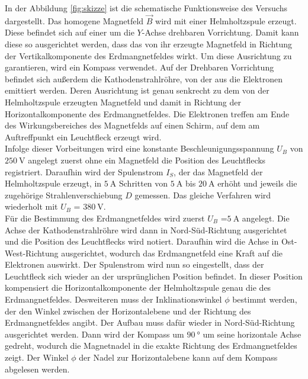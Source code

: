 In der Abbildung \ref{fig:skizze} ist die schematische Funktionsweise des Versuchs dargestellt. Das homogene Magnetfeld $\vec{B}$
wird mit einer Helmholtzspule erzeugt. Diese befindet sich auf einer um die $Y$-Achse drehbaren Vorrichtung. Damit kann diese 
so ausgerichtet werden, dass das von ihr erzeugte Magnetfeld in Richtung der Vertikalkomponente des Erdmangnetfeldes wirkt. 
Um diese Ausrichtung zu garantieren, wird ein Kompass verwendet. Auf der Drehbaren Vorrichtung befindet sich außerdem die 
Kathodenstrahlröhre, von der aus die Elektronen emittiert werden. Deren Ausrichtung ist genau senkrecht zu dem von der 
Helmholtzspule erzeugten Magnetfeld und damit in Richtung der Horizontalkomponente des Erdmangnetfeldes. Die Elektronen 
treffen am Ende des Wirkungsbereiches des Magnetfelds auf einen Schirm, auf dem am Auftreffpunkt ein Leuchtfleck erzeugt wird.\\
Infolge dieser Vorbeitungen wird eine konstante Beschleunigungsspannung $U_B$ von $\SI{250}{\volt} $ angelegt zuerst ohne ein 
Magnetfeld die Position des Leuchtflecks registriert. Daraufhin wird der Spulenstrom $I_S$, der das Magnetfeld der 
Helmholtzspule erzeugt, in $\SI{5}{\ampere} $ Schritten von $\SI{5}{\ampere} $ bis $\SI{20}{\ampere} $ erhöht und jeweils 
die zugehörige Strahlenverschiebung $D$ gemessen. Das gleiche Verfahren wird wiederholt mit $U_B$ = $\SI{380}{\volt} $. \\
Für die Bestimmung des Erdmangnetfeldes wird zuerst $U_B$ =$\SI{5}{\ampere} $ angelegt. Die Achse der Kathodenstrahlröhre
wird dann in Nord-Süd-Richtung ausgerichtet und die Position des Leuchtflecks wird notiert. Daraufhin wird die Achse in 
Ost-West-Richtung ausgerichtet, wodurch das Erdmangnetfeld eine Kraft auf die Elektronen auswirkt.
Der Spulenstrom wird nun so eingestellt, dass der Leuchtfleck sich wieder an der ursprünglichen Position befindet. In dieser 
Position kompensiert die Horizontalkomponente der Helmholtzspule genau die des Erdmangnetfeldes. 
Desweiteren muss der Inklinationswinkel $\phi$ bestimmt werden, der den Winkel zwischen der Horizontalebene und der Richtung
des Erdmangnetfeldes angibt. Der Aufbau muss dafür wieder in Nord-Süd-Richtung ausgerichtet werden. Dann wird der Kompass
um $\SI{90}{\degree} $ um seine horizontale Achse gedreht, wodurch die Magnetnadel in die exakte Richtung des Erdmangnetfeldes
zeigt. Der Winkel $\phi$ der Nadel zur Horizontalebene kann auf dem Kompass abgelesen werden. 


